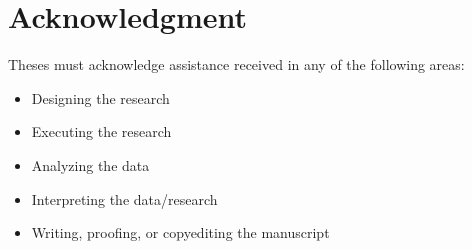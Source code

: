 \chapter*{Acknowledgment} 

Theses must acknowledge assistance received in any of the following areas:

\begin{itemize}
\item Designing the research
\item Executing the research
\item Analyzing the data
\item Interpreting the data/research
\item Writing, proofing, or copyediting the manuscript 
\end{itemize}
